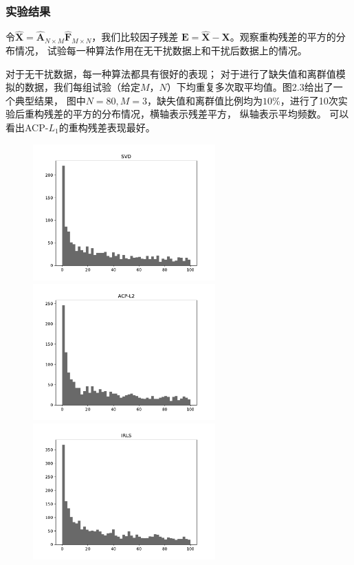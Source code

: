\subsubsection{实验结果}
令$\hat{\bm{X}} = \hat{\bm{A}}_{N \times M}\hat{\bm{F}}_{M \times N}$，我们比较因子残差
$\bm{E} = \hat{\bm{X}} -\bm{X}$。观察重构残差的平方的分布情况，
试验每一种算法作用在无干扰数据上和干扰后数据上的情况。

对于无干扰数据，每一种算法都具有很好的表现；
对于进行了缺失值和离群值模拟的数据，我们每组试验（给定$M$，$ N$）下均重复多次取平均值。图2.3给出了一个典型结果，
图中$N = 80, M=3$，缺失值和离群值比例均为$10\%$，进行了10次实验后重构残差的平方的分布情况，横轴表示残差平方，
纵轴表示平均频数。
可以看出ACP-$L_1$的重构残差表现最好。
\begin{figure}[H]
    \centering
    \begin{minipage}[t]{0.48\textwidth}
    \includegraphics[width=7cm]{pics/lab1/svd.pdf}
    \end{minipage}
    \begin{minipage}[t]{0.48\textwidth}
    \includegraphics[width=7cm]{pics/lab1/acp-l2.pdf}
    \end{minipage}
    \begin{minipage}[t]{0.48\textwidth}
    \includegraphics[width=7cm]{pics/lab1/IRLS.pdf}

\end{minipage}
\end{figure}

